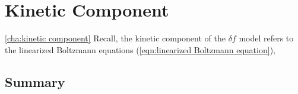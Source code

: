 \chapter{Kinetic Component}\ref{cha:kinetic component}
    Recall, the kinetic component of the $\delta\!f$ model refers to the linearized Boltzmann equations (\ref{eqn:linearized Boltzmann equation}),
    
    \line
    


    
    
    
    


    \section*{Summary}
    